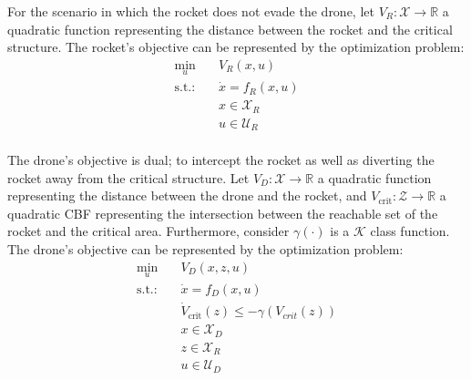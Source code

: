 For the scenario in which the rocket does not evade the drone, let $V_R : \mathcal{X} \rightarrow \mathbb{R}$ a quadratic function representing the distance between the rocket and the critical structure. The rocket's objective can be represented by the optimization problem:
\begin{align*}
    \underset{u}{\text{min}} &\quad V_{R}(x,u) \\
    \text{s.t.:} &\quad \dot{x} = f_R(x, u) \\
    &\quad x \in \mathcal{X}_{R} \\
    &\quad u \in \mathcal{U}_R \\
\end{align*}

The drone's objective is dual; to intercept the rocket as well as diverting the rocket away from the critical structure. Let $V_D : \mathcal{X} \rightarrow \mathbb{R}$ a quadratic function representing the distance between the drone and the rocket, and $V_{\text{crit}} : \mathcal{Z} \rightarrow \mathbb{R}$ a quadratic CBF representing the intersection between the reachable set of the rocket and the critical area. Furthermore, consider $\gamma (\cdot)$ is a $\mathcal{K}$ class function. The drone's objective can be represented by the optimization problem:
\begin{align*}
    \underset{u}{\text{min}} &\quad V_{D}(x,z,u) \\
    \text{s.t.:} &\quad \dot{x} = f_D(x, u) \\
    &\quad \dot{V}_{\text{crit}}(z) \le -\gamma (V_{crit}(z)) \\
    &\quad x \in \mathcal{X}_{D} \\
    &\quad z \in \mathcal{X}_R \\
    &\quad u \in \mathcal{U}_D \\
\end{align*}

